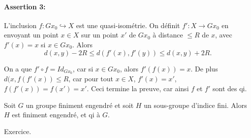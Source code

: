 \begin{preuve}
    \paragraph{Assertion 3:} L'inclusion $f: Gx_0 \hookrightarrow X$ est une quasi-isométrie. On définit $f':
    X \to Gx_0$ en envoyant un point $x \in X$ sur un point $x'$ de $Gx_0$ à distance $\leq R$ de $x$, avec
    $f'(x)=x$ si $x \in Gx_0$. Alors
      \[d(x,y) - 2R \leq d(f'(x), f'(y)) \leq d(x,y) + 2R.\]
      \begin{center}
    \end{center}
    On a que $f' \circ f = Id_{Gx_0}$, car si $x \in Gx_0$, alors $f'(f(x)) = x$. De plus $d(x, f(f'(x)) \leq
    R$, car pour tout $x \in X$, $f'(x) = x'$, $f(f'(x)) = f(x') = x'$. Ceci termine la preuve, car ainsi $f$
    et $f'$ sont des qi.
  \end{preuve}


  \begin{cor}
    Soit $G$ un groupe finiment engendré et soit $H$ un sous-groupe d'indice fini. Alors $H$ est finiment
    engendré, et qi à $G$.
  \end{cor}

  \begin{preuve}
    Exercice.
  \end{preuve}

  

  

  





